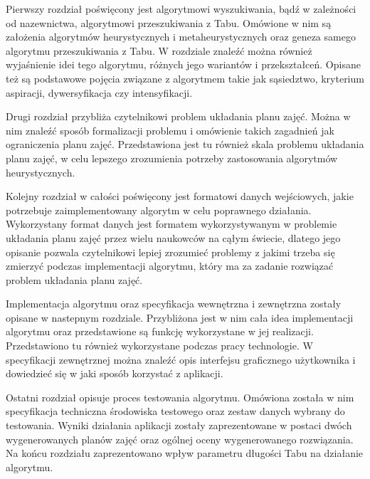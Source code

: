 Pierwszy rozdział poświęcony jest algorytmowi wyszukiwania, bądź w zależności od nazewnictwa, algorytmowi przeszukiwania z Tabu. Omówione w nim są założenia algorytmów heurystycznych i metaheurystycznych oraz geneza samego algorytmu przeszukiwania z Tabu. W rozdziale znaleźć można również wyjaśnienie idei tego algorytmu, różnych jego wariantów i przekształceń. Opisane też są podstawowe pojęcia związane z algorytmem takie jak sąsiedztwo, kryterium aspiracji, dywersyfikacja czy intensyfikacji.

Drugi rozdział przybliża czytelnikowi problem układania planu zajęć. Można w nim znaleźć sposób formalizacji problemu i omówienie takich zagadnień jak ograniczenia planu zajęć. Przedstawiona jest tu również skala problemu układania planu zajęć, w celu lepszego zrozumienia potrzeby zastosowania algorytmów heurystycznych.

Kolejny rozdział w całości poświęcony jest formatowi danych wejściowych, jakie potrzebuje zaimplementowany algorytm w celu poprawnego działania. Wykorzystany format danych jest formatem wykorzystywanym w problemie układania planu zajęć przez wielu naukowców na cąłym świecie, dlatego jego opisanie pozwala czytelnikowi lepiej zrozumieć problemy z jakimi trzeba się zmierzyć podczas implementacji algorytmu, który ma za zadanie rozwiązać problem układania planu zajęć.

Implementacja algorytmu oraz specyfikacja wewnętrzna i zewnętrzna zostały opisane w nastepnym rozdziale. Przybliżona jest w nim cała idea implementacji algorytmu oraz przedstawione są funkcję wykorzystane w jej realizacji. Przedstawiono tu również wykorzystane podczas pracy technologie. W specyfikacji zewnętrznej można znaleźć opis interfejsu graficznego użytkownika i dowiedzieć się w jaki sposób korzystać z aplikacji.

Ostatni rozdział opisuje proces testowania algorytmu. Omówiona została w nim specyfikacja techniczna środowiska testowego oraz zestaw danych wybrany do testowania. Wyniki działania aplikacji zostały zaprezentowane w postaci dwóch wygenerowanych planów zajęć oraz ogólnej oceny wygenerowanego rozwiązania. Na końcu rozdziału zaprezentowano wpływ parametru długości Tabu na działanie algorytmu.